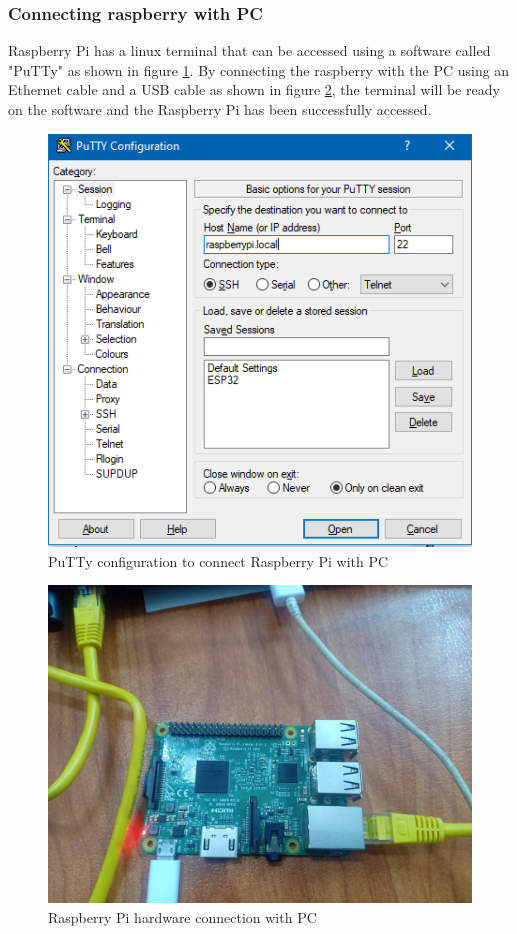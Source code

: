 \subsubsection{Connecting raspberry with PC}
Raspberry Pi has a linux terminal that can be accessed using a software called "PuTTy" as shown in figure  \ref{fig:putty-config}. By connecting the raspberry with the PC using an Ethernet cable and a USB cable as shown in figure \ref{fig:ether-rasp}, the terminal will be ready on the software and the Raspberry Pi has been successfully accessed. \\

\begin{figure}[h]
    \centering
    \includegraphics[width = .75\textwidth]{figure/5_15.PNG}
    \caption{PuTTy configuration to connect Raspberry Pi with PC}
    \label{fig:putty-config}
    \end{figure}
\newpage 

\begin{figure}[h]
    \centering
    \includegraphics[width = .7\textwidth]{figure/5_16.jpg}
    \caption{Raspberry Pi hardware connection with PC}
    \label{fig:ether-rasp}
    \end{figure}
\clearpage 
